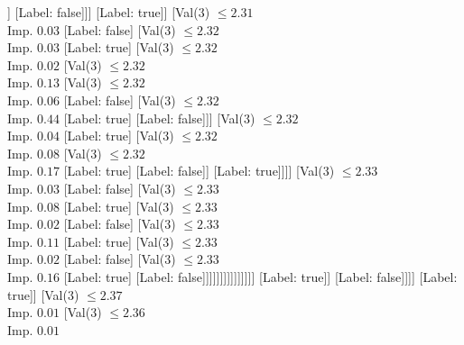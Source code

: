 \documentclass[margin=10pt]{standalone}
\begin{document}
\begin{forest}
																										]
																									[Label: false]]]
																							[Label: true]]
																						[Val($3$) $ \leq 2.31$ \\ Imp. $0.03$
																							[Label: false]
																							[Val($3$) $ \leq 2.32$ \\ Imp. $0.03$
																								[Label: true]
																								[Val($3$) $ \leq 2.32$ \\ Imp. $0.02$
																									[Val($3$) $ \leq 2.32$ \\ Imp. $0.13$
																										[Val($3$) $ \leq 2.32$ \\ Imp. $0.06$
																											[Label: false]
																											[Val($3$) $ \leq 2.32$ \\ Imp. $0.44$
																												[Label: true]
																												[Label: false]]]
																										[Val($3$) $ \leq 2.32$ \\ Imp. $0.04$
																											[Label: true]
																											[Val($3$) $ \leq 2.32$ \\ Imp. $0.08$
																												[Val($3$) $ \leq 2.32$ \\ Imp. $0.17$
																													[Label: true]
																													[Label: false]]
																												[Label: true]]]]
																									[Val($3$) $ \leq 2.33$ \\ Imp. $0.03$
																										[Label: false]
																										[Val($3$) $ \leq 2.33$ \\ Imp. $0.08$
																											[Label: true]
																											[Val($3$) $ \leq 2.33$ \\ Imp. $0.02$
																												[Label: false]
																												[Val($3$) $ \leq 2.33$ \\ Imp. $0.11$
																													[Label: true]
																													[Val($3$) $ \leq 2.33$ \\ Imp. $0.02$
																														[Label: false]
																														[Val($3$) $ \leq 2.33$ \\ Imp. $0.16$
																															[Label: true]
																															[Label: false]]]]]]]]]]]]]]]
																	[Label: true]]
																[Label: false]]]]
													[Label: true]]
												[Val($3$) $ \leq 2.37$ \\ Imp. $0.01$
													[Val($3$) $ \leq 2.36$ \\ Imp. $0.01$

\end{forest}
\end{document}
